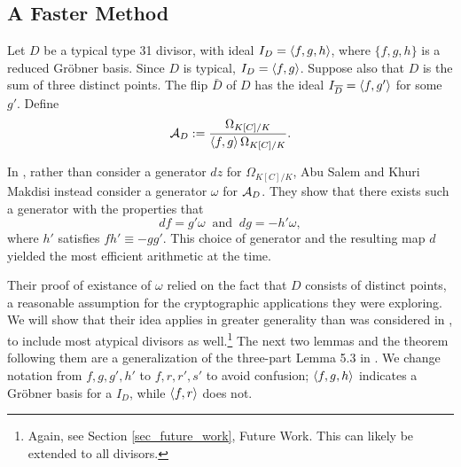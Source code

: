 \subsection{A Faster Method}

Let $D$ be a typical type 31 divisor, with ideal $I_D = \pid{f,g,h}$,
where $\{f,g,h\}$ is a reduced Gr\"obner basis.
Since $D$ is typical, $I_D = \pid{f,g}$.
Suppose also that $D$ is the sum of three distinct points.
The flip $\bar D$ of $D$ has the ideal $I_{\bar D} = \pid{f, g'}$ for some $g'$.
Define
\[ \cal A_D := \frac {\Omega_{K[C]/K}} {\pid{f,g} \Omega_{K[C]/K}}. \]

In \cite{salem07}, rather than consider a generator $dz$ for $\Omega_{K[C]/K}$,
Abu Salem and Khuri Makdisi instead consider a generator $\omega$ for $\cal A_D$.
They show that there exists such a generator with the properties that
\[ df = g'\omega ~\text{ and }~ dg = -h'\omega, \]
where $h'$ satisfies $fh' \equiv -gg'$.
This choice of generator and the resulting map $d$ yielded the most efficient arithmetic at the time.

Their proof of existance of $\omega$ relied on the fact that $D$ consists of distinct points,
a reasonable assumption for the cryptographic applications they were exploring.
We will show that their idea applies in greater generality than was considered in \cite{salem07},
to include most atypical divisors as well.\footnote
{Again, see Section \ref{sec_future_work}, Future Work. This can likely be extended to all divisors.}
The next two lemmas and the theorem following them are a generalization of the three-part Lemma 5.3 in \cite{salem07}.
We change notation from $f,g,g',h'$ to $f,r,r',s'$ to avoid confusion;
$\pid{f,g,h}$ indicates a Gr\"obner basis for a $I_D$, while $\pid{f,r}$ does not.

